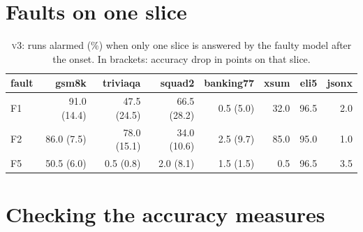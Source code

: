\documentclass{article}
\newcommand{\vthree}{\textsc{v3}}
\begin{document}
\section{Faults on one slice}
\begin{table}[h]
  \centering\small
  \caption{\vthree{}: runs alarmed (\%) when only one slice is answered by the
  faulty model after the onset. In brackets: accuracy drop in points on that slice.}
  \begin{tabular}{lrrrrrrr}
    \toprule
    fault & gsm8k & triviaqa & squad2 & banking77 & xsum & eli5 & jsonx \\
    \midrule
    F1 & 91.0 (14.4) & 47.5 (24.5) & 66.5 (28.2) & 0.5 (5.0) & 32.0 & 96.5 & 2.0 \\
    F2 & 86.0 (7.5) & 78.0 (15.1) & 34.0 (10.6) & 2.5 (9.7) & 85.0 & 95.0 & 1.0 \\
    F5 & 50.5 (6.0) & 0.5 (0.8) & 2.0 (8.1) & 1.5 (1.5) & 0.5 & 96.5 & 3.5 \\
    \bottomrule
  \end{tabular}
\end{table}

\clearpage
\section{Checking the accuracy measures}
\end{document}
